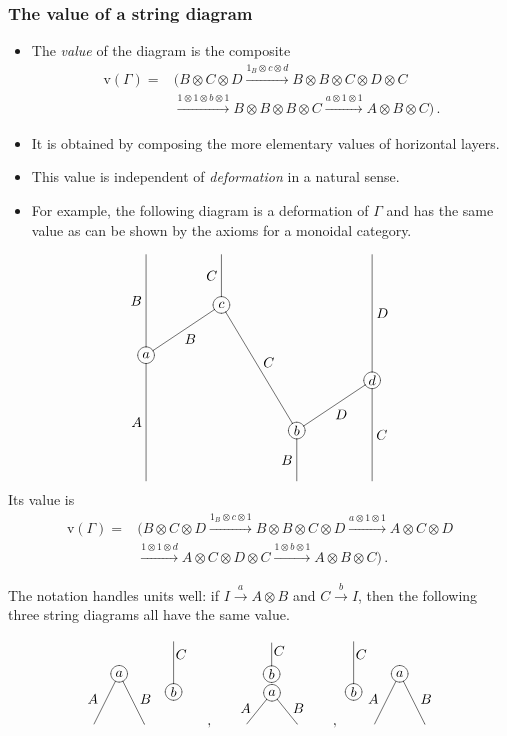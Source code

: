 \documentclass{beamer}
\newcommand{\lra}{\longrightarrow}
\begin{document}
\begin{frame}
  \frametitle{The value of a string diagram}
\begin{itemize}
\item 
The \emph{value} of the diagram is the composite
\begin{align*}
 \mathrm{v}(\Gamma) =& (B \otimes C \otimes D \stackrel{1_B\otimes c \otimes d}\lra
 B \otimes B \otimes C \otimes D \otimes C
\\
 & \stackrel{1\otimes 1\otimes b \otimes 1}\lra   
 B \otimes B \otimes B \otimes C  \stackrel{a \otimes 1\otimes  1}\lra  
 A \otimes B  \otimes C)\,.
\end{align*}
\pause
\item It is obtained by composing the more elementary values of horizontal layers. 
\pause
\item This value is independent of \emph{deformation} in a natural sense. 
\pause
\item For example, the following diagram is a deformation of $\Gamma$ and has the same value as can be shown by the axioms for a monoidal category.   
\end{itemize}
\end{frame}
\begin{frame}

\[ 
\xygraph{{a} *\xycircle<6pt>{-}="a" [r(1.5)u] {c} *\xycircle<6pt>{-}="c" [r(1.5)d(2.5)] {b} *\xycircle<6pt>{-}="b" [r(1.5)u] {d} *\xycircle<6pt>{-}="d" "a" (-[u(2)]^-*{B},-[d(2.5)]_-*{A},-"c"_-*{B}(-[u]^-*{C},-"b"^-*{C}(-[d]_-*{B},-"d"_-*{D}(-[u(2.5)]_-*{D},-[d(2)]^-*{C}))))} 
\]
Its value is 
\begin{align*}
\mathrm{v}(\Gamma) =& (B \otimes C \otimes D \stackrel{1_B\otimes c \otimes 1}\lra 
 B \otimes B \otimes C \otimes D \stackrel{a \otimes 1 \otimes 1}\lra 
 A \otimes C \otimes D
\\
 & \stackrel{1\otimes 1\otimes d} \lra  
  A \otimes C \otimes D \otimes C   \stackrel{1 \otimes b \otimes  1} \lra  
  A \otimes B  \otimes C)\,.
\end{align*}
\end{frame}
\begin{frame}
The notation handles units well:
if $I   \stackrel{a}{\lra}   A \otimes B$ and $C \stackrel{b}{\lra}  I$, 
then the following three string diagrams all have the same value.
\[ 
\xygraph{!{0;(1.25,0):(0,.65)::} {\xybox{\xygraph{{\xybox{\xygraph{!{0;(.5,0):(0,2)::} {a} *\xycircle<6pt>{-}="m" "m"(-[dl] [l(.05)u(.5)] {A},-[dr] [r(.05)u(.5)] {B})}}} [u(.5)r(1.5)] {\xybox{\xygraph{{b} *\xycircle<6pt>{-}="m" "m" -[u] [r(.15)d(.25)] {C}}}}}}}
[dr] {,} [ur]
{\xybox{\xygraph{{\xybox{\xygraph{!{0;(.5,0):(0,1.24)::} {a} *\xycircle<6pt>{-}="m" "m"(-[dl] [l(.05)u(.5)] {A},-[dr] [r(.05)u(.5)] {B})}}} [u(.61)r(.41)] {\xybox{\xygraph{!{0;(1,0):(0,.62)::} {b} *\xycircle<6pt>{-}="m" "m" -[u] [r(.15)d(.25)] {C}}}}}}}
[dr] {,} [ur]
{\xybox{\xygraph{{\xybox{\xygraph{!{0;(.5,0):(0,2)::} {a} *\xycircle<6pt>{-}="m" "m"(-[dl] [l(.05)u(.5)] {A},-[dr] [r(.05)u(.5)] {B})}}} [u(.5)l(.5)] {\xybox{\xygraph{{b} *\xycircle<6pt>{-}="m" "m" -[u] [r(.15)d(.25)] {C}}}}}}}} 
\]
\end{frame}
\end{document}
